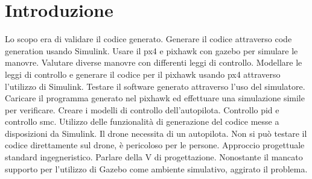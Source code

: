 \chapter{Introduzione}
\begin{commento}
	Lo scopo era di validare il codice generato.
	Generare il codice attraverso code generation usando Simulink.
	Usare il px4 e pixhawk con gazebo per simulare le manovre.
	Valutare diverse manovre con differenti leggi di controllo.
	Modellare le leggi di controllo e generare il codice per il pixhawk usando px4 attraverso l'utilizzo di Simulink.
	Testare il software generato attraverso l'uso del simulatore. Caricare il programma generato nel pixhawk ed effettuare una simulazione simile per verificare.
	Creare i modelli di controllo dell'autopilota.
	Controllo pid e controllo smc.
	Utilizzo delle funzionalità di generazione del codice messe a disposizioni da Simulink.
	Il drone necessita di un autopilota.
	Non si può testare il codice direttamente sul drone, è pericoloso per le persone.
	Approccio progettuale standard ingegneristico.
	Parlare della V di progettazione.
	Nonostante il mancato supporto per l'utilizzo di Gazebo come ambiente simulativo, aggirato il problema.
\end{commento}

